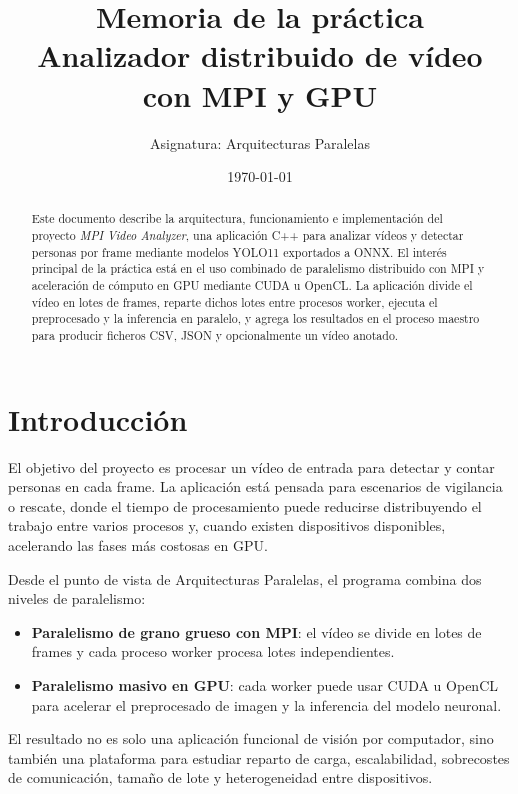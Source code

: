 \documentclass[12pt,a4paper]{article}
\title{\textbf{Memoria de la pr\'actica}\\[0.3cm]
Analizador distribuido de v\'ideo con MPI y GPU}
\author{Asignatura: Arquitecturas Paralelas}
\date{\today}
\begin{document}
\maketitle
\thispagestyle{empty}

\begin{abstract}
Este documento describe la arquitectura, funcionamiento e implementaci\'on del proyecto
\textit{MPI Video Analyzer}, una aplicaci\'on C++ para analizar v\'ideos y detectar personas
por frame mediante modelos YOLO11 exportados a ONNX. El inter\'es principal de la pr\'actica
est\'a en el uso combinado de paralelismo distribuido con MPI y aceleraci\'on de c\'omputo en
GPU mediante CUDA u OpenCL. La aplicaci\'on divide el v\'ideo en lotes de frames, reparte
dichos lotes entre procesos worker, ejecuta el preprocesado y la inferencia en paralelo, y
agrega los resultados en el proceso maestro para producir ficheros CSV, JSON y opcionalmente
un v\'ideo anotado.
\end{abstract}

\newpage
\tableofcontents
\newpage

\section{Introducci\'on}

El objetivo del proyecto es procesar un v\'ideo de entrada para detectar y contar personas en
cada frame. La aplicaci\'on est\'a pensada para escenarios de vigilancia o rescate, donde el
tiempo de procesamiento puede reducirse distribuyendo el trabajo entre varios procesos y,
cuando existen dispositivos disponibles, acelerando las fases m\'as costosas en GPU.

Desde el punto de vista de Arquitecturas Paralelas, el programa combina dos niveles de
paralelismo:

\begin{itemize}
    \item \textbf{Paralelismo de grano grueso con MPI}: el v\'ideo se divide en lotes de frames
    y cada proceso worker procesa lotes independientes.
    \item \textbf{Paralelismo masivo en GPU}: cada worker puede usar CUDA u OpenCL para
    acelerar el preprocesado de imagen y la inferencia del modelo neuronal.
\end{itemize}

El resultado no es solo una aplicaci\'on funcional de visi\'on por computador, sino tambi\'en
una plataforma para estudiar reparto de carga, escalabilidad, sobrecostes de comunicaci\'on,
tama\~no de lote y heterogeneidad entre dispositivos.
\end{document}
